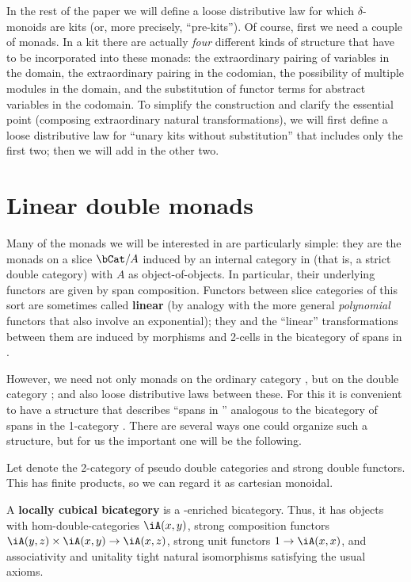 \documentclass{amsart}
\newcommand{\dl}{\delta}
\begin{document}
In the rest of the paper we will define a loose distributive law for which $\dl$-monoids are kits (or, more precisely, ``pre-kits'').
Of course, first we need a couple of monads.
In a kit there are actually \emph{four} different kinds of structure that have to be incorporated into these monads: the extraordinary pairing of variables in the domain, the extraordinary pairing in the codomian, the possibility of multiple modules in the domain, and the substitution of functor terms for abstract variables in the codomain.
To simplify the construction and clarify the essential point (composing extraordinary natural transformations), we will first define a loose distributive law for ``unary kits without substitution'' that includes only the first two; then we will add in the other two.

\section{Linear double monads}
\label{sec:linear-double-monads}

Many of the monads we will be interested in are particularly simple: they are the monads on a slice $\bCat/A$ induced by an internal category in \bCat (that is, a strict double category) with $A$ as object-of-objects.
In particular, their underlying functors are given by span composition.
Functors between slice categories of this sort are sometimes called \textbf{linear} (by analogy with the more general \emph{polynomial} functors that also involve an exponential); they and the ``linear'' transformations between them are induced by morphisms and 2-cells in the bicategory of spans in \bCat.

However, we need not only monads on the ordinary category \bCat, but on the double category \dCat; and also loose distributive laws between these.
For this it is convenient to have a structure that describes ``spans in \dCat'' analogous to the bicategory of spans in the 1-category \bCat.
There are several ways one could organize such a structure, but for us the important one will be the following.

Let \cDbl denote the 2-category of pseudo double categories and strong double functors.
This has finite products, so we can regard it as cartesian monoidal.

\begin{defn}
  A \textbf{locally cubical bicategory} is a \cDbl-enriched bicategory.
  Thus, it has objects with hom-double-categories $\iA(x,y)$, strong composition functors $\iA(y,z)\times \iA(x,y) \to \iA(x,z)$, strong unit functors $1\to \iA(x,x)$, and associativity and unitality tight natural isomorphisms satisfying the usual axioms.
\end{defn}
\end{document}
